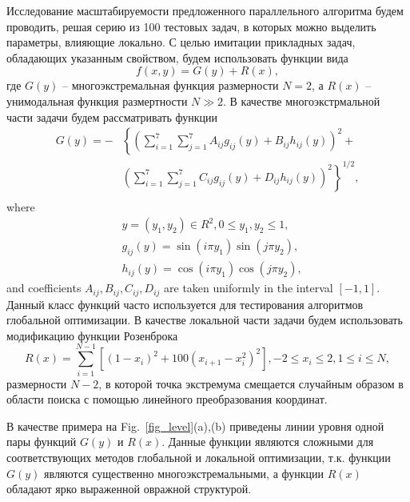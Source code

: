 \documentclass{svproc}
\begin{document}

Исследование масштабируемости предложенного параллельного алгоритма будем проводить, решая серию из 100 тестовых задач, в которых можно выделить параметры, влияющие локально. С целью имитации прикладных задач, обладающих указанным свойством, будем использовать функции вида 
\[
f(x,y) = G(y)+R(x),
\]
где $G(y)$ -- многоэкстремальная функция размерности $N=2$, а $R(x)$ -- унимодальная функция размертности $N \gg 2$.
В качестве многоэкстрмальной части задачи будем рассматривать функции 
\begin{eqnarray} \nonumber \label{vagris}
G(y)= -&\left\{\left(\sum^{7}_{i=1}\sum^{7}_{j=1}A_{ij}g_{ij}(y)+B_{ij}h_{ij}(y)\right)^2+\right. \\
&\left.\left(\sum^{7}_{i=1}\sum^{7}_{j=1}C_{ij}g_{ij}(y)+D_{ij}h_{ij}(y)\right)^2\right\}^{1/2},\\ \nonumber
\end{eqnarray}
where
\begin{eqnarray} \nonumber
& y=(y_1,y_2)\in R^2, 0 \leq y_1,y_2 \leq 1, \\ \nonumber
& g_{ij}(y)=\sin(i\pi y_1)\sin(j\pi y_2),  \\ \nonumber
& h_{ij}(y)=\cos(i\pi y_1)\cos(j\pi y_2), \nonumber 
\end{eqnarray}
and coefficients $A_{ij}, B_{ij}, C_{ij}, D_{ij}$  are taken uniformly in the interval $[-1,1]$.
Данный класс функций часто используется для тестирования алгоритмов глобальной оптимизации.  
В качестве локальной части задачи будем использовать модификацию функции Розенброка 
\[
R(x)= \sum_{i=1}^{N-1}{\left[(1-x_i)^2+100(x_{i+1}-x_i^2)^2\right]}, -2 \leq x_i \leq 2 , 1\leq i\leq N,
\]
размерности $N-2$, в которой точка экстремума смещается случайным образом в области поиска с помощью линейного преобразования координат.

В качестве примера на Fig.~\ref{fig_level}(a),(b) приведены линии уровня одной пары функций $G(y)$ и $R(x)$. Данные функции являются сложными для соответствующих методов глобальной и локальной оптимизации, т.к. функции $G(y)$ являются существенно многоэкстремальными, а функции $R(x)$ обладают ярко выраженной овражной структурой.
\end{document}
